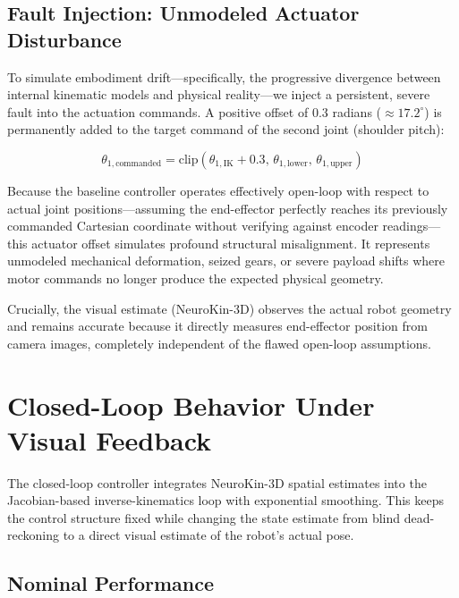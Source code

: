\documentclass[12pt,a4paper,oneside]{report}
\begin{document}
\subsection{Fault Injection: Unmodeled Actuator Disturbance}
\label{subsec:fault_injection_unmodeled_actuator_disturbance}

To simulate embodiment drift—specifically, the progressive divergence between internal kinematic models and physical reality—we inject a persistent, severe fault into the actuation commands. A positive offset of 0.3 radians ($\approx 17.2^\circ$) is permanently added to the target command of the second joint (shoulder pitch):

\begin{equation}
\theta_{1,\text{commanded}} = \text{clip}(\theta_{1,\text{IK}} + 0.3, \, \theta_{1,\text{lower}}, \, \theta_{1,\text{upper}})
\end{equation}

Because the baseline controller operates effectively open-loop with respect to actual joint positions—assuming the end-effector perfectly reaches its previously commanded Cartesian coordinate without verifying against encoder readings—this actuator offset simulates profound structural misalignment. It represents unmodeled mechanical deformation, seized gears, or severe payload shifts where motor commands no longer produce the expected physical geometry.

Crucially, the visual estimate (NeuroKin-3D) observes the actual robot geometry and remains accurate because it directly measures end-effector position from camera images, completely independent of the flawed open-loop assumptions.

\section{Closed-Loop Behavior Under Visual Feedback}

The closed-loop controller integrates NeuroKin-3D spatial estimates into the Jacobian-based inverse-kinematics loop with exponential smoothing. This keeps the control structure fixed while changing the state estimate from blind dead-reckoning to a direct visual estimate of the robot's actual pose.

\subsection{Nominal Performance}
\label{subsec:nominal_performance}
\end{document}

